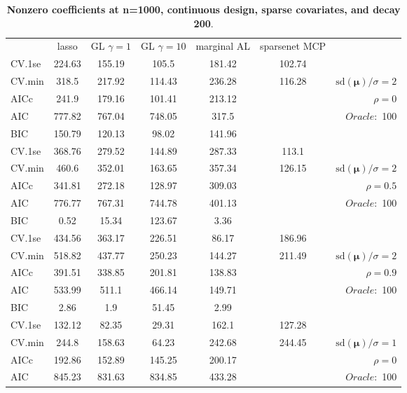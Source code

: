 \begin{table}\vspace{-.5cm}
\caption[l]{ { \bf Nonzero coefficients at n=1000, continuous design, 
sparse covariates, and  decay  200}.}
\vspace{-.5cm}
\footnotesize{}
\begin{center}
\begin{tabular}{l*{5}{c}|r}
& lasso & GL $\gamma=1$ & GL $\gamma=10$ & marginal AL & sparsenet MCP  & \\
 \cline{1-7}
CV.1se & 224.63 & 155.19 & 105.5 & 181.42 & 102.74 & \\
CV.min & 318.5 & 217.92 & 114.43 & 236.28 & 116.28 &  $\mathrm{sd}(\mathbf{\mu})/\sigma=2$ \\
AICc & 241.9 & 179.16 & 101.41 & 213.12 & & $\rho=0$ \\
AIC & 777.82 & 767.04 & 748.05 & 317.5 & &  \multirow{2}{*}{$Oracle: $ 100} \\
BIC & 150.79 & 120.13 & 98.02 & 141.96 & &  \\
 \hline 
CV.1se & 368.76 & 279.52 & 144.89 & 287.33 & 113.1 & \\
CV.min & 460.6 & 352.01 & 163.65 & 357.34 & 126.15 &  $\mathrm{sd}(\mathbf{\mu})/\sigma=2$ \\
AICc & 341.81 & 272.18 & 128.97 & 309.03 & & $\rho=0.5$ \\
AIC & 776.77 & 767.31 & 744.78 & 401.13 & &  \multirow{2}{*}{$Oracle: $ 100} \\
BIC & 0.52 & 15.34 & 123.67 & 3.36 & &  \\
 \hline 
CV.1se & 434.56 & 363.17 & 226.51 & 86.17 & 186.96 & \\
CV.min & 518.82 & 437.77 & 250.23 & 144.27 & 211.49 &  $\mathrm{sd}(\mathbf{\mu})/\sigma=2$ \\
AICc & 391.51 & 338.85 & 201.81 & 138.83 & & $\rho=0.9$ \\
AIC & 533.99 & 511.1 & 466.14 & 149.71 & &  \multirow{2}{*}{$Oracle: $ 100} \\
BIC & 2.86 & 1.9 & 51.45 & 2.99 & &  \\
 \hline 
CV.1se & 132.12 & 82.35 & 29.31 & 162.1 & 127.28 & \\
CV.min & 244.8 & 158.63 & 64.23 & 242.68 & 244.45 &  $\mathrm{sd}(\mathbf{\mu})/\sigma=1$ \\
AICc & 192.86 & 152.89 & 145.25 & 200.17 & & $\rho=0$ \\
AIC & 845.23 & 831.63 & 834.85 & 433.28 & &  \multirow{2}{*}{$Oracle: $ 100} \\

\end{tabular}
\end{center}
\end{table}
